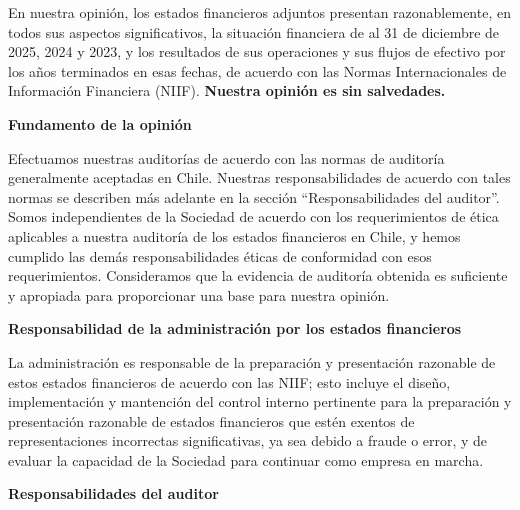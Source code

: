 \documentclass[11pt]{article}
\begin{document}
En nuestra opinión, los estados financieros adjuntos presentan razonablemente, en todos sus aspectos significativos, la situación financiera de \LFXempresa{} al 31 de diciembre de 2025, 2024 y 2023, y los resultados de sus operaciones y sus flujos de efectivo por los años terminados en esas fechas, de acuerdo con las Normas Internacionales de Información Financiera (NIIF). \textbf{Nuestra opinión es sin salvedades.}

\noindent\textbf{Fundamento de la opinión}

\noindent Efectuamos nuestras auditorías de acuerdo con las normas de auditoría generalmente aceptadas en Chile. Nuestras responsabilidades de acuerdo con tales normas se describen más adelante en la sección ``Responsabilidades del auditor''. Somos independientes de la Sociedad de acuerdo con los requerimientos de ética aplicables a nuestra auditoría de los estados financieros en Chile, y hemos cumplido las demás responsabilidades éticas de conformidad con esos requerimientos. Consideramos que la evidencia de auditoría obtenida es suficiente y apropiada para proporcionar una base para nuestra opinión.

\noindent\textbf{Responsabilidad de la administración por los estados financieros}

\noindent La administración es responsable de la preparación y presentación razonable de estos estados financieros de acuerdo con las NIIF; esto incluye el diseño, implementación y mantención del control interno pertinente para la preparación y presentación razonable de estados financieros que estén exentos de representaciones incorrectas significativas, ya sea debido a fraude o error, y de evaluar la capacidad de la Sociedad para continuar como empresa en marcha.

\noindent\textbf{Responsabilidades del auditor}
\end{document}
